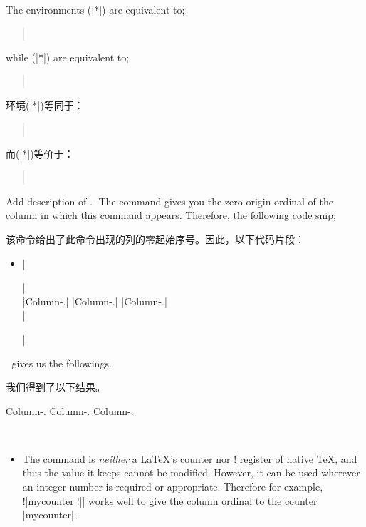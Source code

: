 \begin{description}
\begin{itemize}
\begin{paracol}{2}
\item
The environments (|*|) are equivalent to;
\begin{quote}
\\
\end{quote}
while (|*|) are equivalent to;
\begin{quote}
\\
\end{quote}
\switchcolumn
\item
环境(|*|)等同于：
\begin{quote}
\\
\end{quote}
而(|*|)等价于：
\begin{quote}
\\
\end{quote}
\end{paracol}
\end{itemize}


\item[\Midx{\!\thecolumn!}]\mbox{}\par
{}
{Add description of .}
The command gives you the zero-origin ordinal of the column in which this
command appears.  Therefore, the following code snip;

该命令给出了此命令出现的列的零起始序号。因此，以下代码片段：
\begin{itemize}\item[]
|\begin{paracol}{3}|\\
|Column-\thecolumn.\switchcolumn|
|Column-\thecolumn.\switchcolumn|
|Column-\thecolumn.|\\
|\end{paracol}|
\end{itemize}

gives us the followings.

我们得到了以下结果。

\par\medskip
\begin{paracol}{3}
Column-\thecolumn.\switchcolumn
Column-\thecolumn.\switchcolumn
Column-\thecolumn.
\end{paracol}

\begin{itemize}
\item
The command is {\em neither} a \LaTeX's counter nor \!\count! register of
native \TeX{}, and thus the value it keeps cannot be modified.  However,
it can be used wherever an integer number is required or appropriate.
Therefore for example, \!\setcounter!|{mycounter}{|\!\thecolumn!|}| works
well to give the column ordinal to the counter |mycounter|.


\end{itemize}
\end{description}
